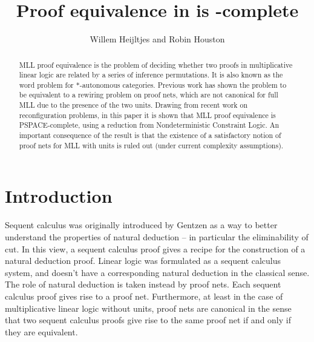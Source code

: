 \documentclass{lmcs}
\title{Proof equivalence in \capsabbrev{mll} is \capsabbrev{pspace}-complete}
\author{Willem Heijltjes and Robin Houston}
\let\capsabbrev=\uppercase
\begin{document}



\begin{abstract}
\capsabbrev{mll} proof equivalence is the problem of deciding whether two proofs in multiplicative linear logic are related by a series of inference permutations.
%
It is also known as the word problem for $*$-autonomous categories.
%
Previous work has shown the problem to be equivalent to a rewiring problem on proof nets, which are not canonical for full \capsabbrev{mll} due to the presence of the two units.
%
Drawing from recent work on reconfiguration problems, in this paper it is shown that \capsabbrev{mll} proof equivalence is \capsabbrev{pspace}-complete, using a reduction from Nondeterministic Constraint Logic.
%
An important consequence of the result is that the existence of a satisfactory notion of proof nets for \capsabbrev{mll} with units is ruled out (under current complexity assumptions).
\end{abstract}


\maketitle



\section{Introduction}
\noindent
Sequent calculus was originally introduced by Gentzen as a way to better understand
the properties of natural deduction -- in particular the eliminability of cut. In this
view, a sequent calculus proof gives a recipe for the construction of a natural deduction
proof.
%
Linear logic was formulated as a sequent calculus system, and doesn't have a corresponding
natural deduction in the classical sense. The role of natural deduction is taken instead by
proof nets. Each sequent calculus proof gives rise to a proof net. Furthermore, at least in
the case of multiplicative linear logic without units, proof nets are canonical in the sense
that two sequent calculus proofs give rise to the same proof net if and only if they are
equivalent.
\end{document}
